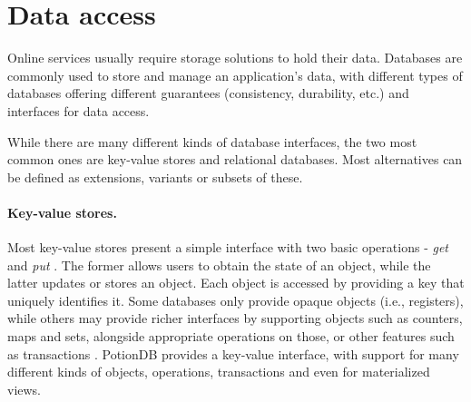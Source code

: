 




\section{Data access}
\label{sec:data_access}

Online services usually require storage solutions to hold their data.
Databases are commonly used to store and manage an application's data, with different types of databases offering different guarantees (consistency, durability, etc.) and interfaces for data access.

While there are many different kinds of database interfaces, the two most common ones are key-value stores and relational databases.
Most alternatives can be defined as extensions, variants or subsets of these.



%

\paragraph{Key-value stores.}
Most key-value stores present a simple interface with two basic operations - \emph{get} and \emph{put} \cite{dynamo, cops, cure, walter, pequod}.	%
The former allows users to obtain the state of an object, while the latter updates or stores an object.
Each object is accessed by providing a key that uniquely identifies it.
Some databases only provide opaque objects (i.e., registers), while others may provide richer interfaces by supporting objects such as counters, maps and sets, alongside appropriate operations on those, or other features such as transactions \cite{cure, walter, pequod}.	%
PotionDB provides a key-value interface, with support for many different kinds of objects, operations, transactions and even for materialized views.

